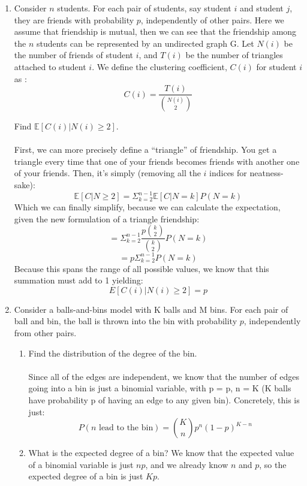 \begin{enumerate}
  \item Consider $n$ students. For each pair of students, say student $i$ and student $j$, they are friends with probability $p$, independently of other pairs. Here we assume that friendship is mutual, then we can see that the friendship among the $n$ students can be represented by an undirected graph G. Let $N(i)$ be the number of friends of student $i$, and $T(i)$ be the number of triangles attached to student $i$. We define the clustering coefficient, $C(i)$ for student $i$ as :
    $$C(i) = \frac{T(i)}{\binom{N(i)}{2}}$$

    Find $\mathds{E}[C(i) | N(i) \geq 2]$.\\\\

    First, we can more precisely define a ``triangle'' of friendship. You get a triangle every time that one of your friends becomes friends with another one of your friends. Then, it's simply (removing all the $i$ indices for neatness-sake):
    $$\mathds{E}[C | N \geq 2] = \Sigma_{k=2}^{n-1} \mathds{E}[C | N = k] P(N = k)$$
    Which we can finally simplify, because we can calculate the expectation, given the new formulation of a triangle friendship:
    $$=\Sigma_{k=2}^{n-1} \frac{p \binom{k}{2}}{\binom{k}{2}} P(N = k)$$
    $$=p \Sigma_{k=2}^{n-1} P(N = k)$$
    Because this spans the range of all possible values, we know that this summation must add to 1 yielding:
    $$E[C(i) | N(i) \geq 2] = p$$


  \item Consider a balls-and-bins model with K balls and M bins. For each pair of ball and bin, the ball is thrown into the bin with probability $p$, independently from other pairs.
    \begin{enumerate}
      \item Find the distribution of the degree of the bin.\\\\
        Since all of the edges are independent, we know that the number of edges going into a bin is just a binomial variable, with p = p, n = K (K balls have probability p of having an edge to any given bin). Concretely, this is just:
        $$P(n \text{ lead to the bin}) = \binom{K}{n} p^n (1-p)^{K-n}$$
      \item What is the expected degree of a bin?
        We know that the expected value of a binomial variable is just $np$, and we already know $n$ and $p$, so the expected degree of a bin is just $Kp$.\\


\end{enumerate}
\end{enumerate}
